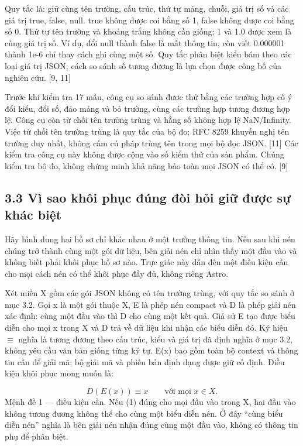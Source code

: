 \documentclass[11pt,a4paper]{article}
\begin{document}
Quy tắc là: giữ cùng tên trường, cấu trúc, thứ tự mảng, chuỗi, giá trị số và các giá trị true, false, null. true không được coi bằng số 1, false không được coi bằng số 0. Thứ tự tên trường và khoảng trắng không cần giống; 1 và 1.0 được xem là cùng giá trị số. Ví dụ, đổi null thành false là mất thông tin, còn viết 0.000001 thành 1e-6 chỉ thay cách ghi cùng một số. Quy tắc phân biệt kiểu bám theo các loại giá trị JSON; cách so sánh số tương đương là lựa chọn được công bố của nghiên cứu. [9, 11]


Trước khi kiểm tra 17 mẫu, công cụ so sánh được thử bằng các trường hợp cố ý đổi kiểu, đổi số, đảo mảng và bỏ trường, cùng các trường hợp tương đương hợp lệ. Công cụ còn từ chối tên trường trùng và hằng số không hợp lệ NaN/\allowbreak{}Infinity. Việc từ chối tên trường trùng là quy tắc của bộ đo; RFC 8259 khuyến nghị tên trường duy nhất, không cấm cú pháp trùng tên trong mọi bộ đọc JSON. [11] Các kiểm tra công cụ này không được cộng vào số kiểm thử của sản phẩm. Chúng kiểm tra bộ đo, không chứng minh khả năng bảo toàn mọi JSON có thể có. [9]


\subsection*{3.3 Vì sao khôi phục đúng đòi hỏi giữ được sự khác biệt}
Hãy hình dung hai hồ sơ chỉ khác nhau ở một trường thông tin. Nếu sau khi nén chúng trở thành cùng một gói dữ liệu, bên giải nén chỉ nhìn thấy một đầu vào và không biết phải khôi phục hồ sơ nào. Trực giác này dẫn đến một điều kiện cần cho mọi cách nén có thể khôi phục đầy đủ, không riêng Astro.


Xét miền X gồm các gói JSON không có tên trường trùng, với quy tắc so sánh ở mục 3.2. Gọi x là một gói thuộc X, E là phép nén compact và D là phép giải nén xác định: cùng một đầu vào thì D cho cùng một kết quả. Giả sử E tạo được biểu diễn cho mọi x trong X và D trả về dữ liệu khi nhận các biểu diễn đó. Ký hiệu \(\equiv\) nghĩa là tương đương theo cấu trúc, kiểu và giá trị đã định nghĩa ở mục 3.2, không yêu cầu văn bản giống từng ký tự. E(x) bao gồm toàn bộ context và thông tin cần để giải mã; bộ giải mã và phiên bản định dạng được giữ cố định. Điều kiện khôi phục mong muốn là:


\begin{equation}D(E(x))\equiv x\qquad\text{với mọi }x\in X.\label{eq:ROUNDTRIP}\end{equation}
Mệnh đề 1 — điều kiện cần. Nếu (1) đúng cho mọi đầu vào trong X, hai đầu vào không tương đương không thể cho cùng một biểu diễn nén. Ở đây “cùng biểu diễn nén” nghĩa là bên giải nén nhận đúng cùng một đầu vào, không có thông tin phụ để phân biệt.
\end{document}
